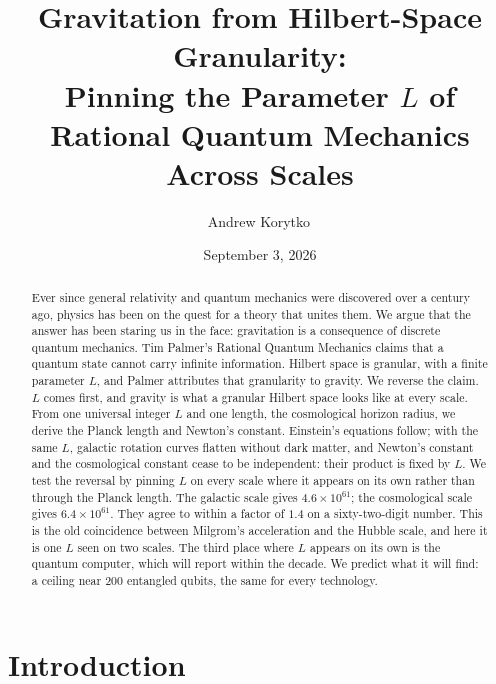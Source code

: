 \documentclass[aps,prd,twocolumn,superscriptaddress,nofootinbib,showkeys]{revtex4-2}
\begin{document}
\title{Gravitation from Hilbert-Space Granularity:\\ Pinning the Parameter $L$ of Rational Quantum Mechanics Across Scales}

\author{Andrew Korytko\,}

\date{September 3, 2026}

\begin{abstract}
Ever since general relativity and quantum mechanics were discovered over a century ago, physics has been on the quest for a theory that unites them. We argue that the answer has been staring us in the face: gravitation is a consequence of discrete quantum mechanics. Tim Palmer's Rational Quantum Mechanics claims that a quantum state cannot carry infinite information. Hilbert space is granular, with a finite parameter $L$, and Palmer attributes that granularity to gravity. We reverse the claim. $L$ comes first, and gravity is what a granular Hilbert space looks like at every scale. From one universal integer $L$ and one length, the cosmological horizon radius, we derive the Planck length and Newton's constant. Einstein's equations follow; with the same $L$, galactic rotation curves flatten without dark matter, and Newton's constant and the cosmological constant cease to be independent: their product is fixed by $L$. We test the reversal by pinning $L$ on every scale where it appears on its own rather than through the Planck length. The galactic scale gives $4.6\times10^{61}$; the cosmological scale gives $6.4\times10^{61}$. They agree to within a factor of $1.4$ on a sixty-two-digit number. This is the old coincidence between Milgrom's acceleration and the Hubble scale, and here it is one $L$ seen on two scales. The third place where $L$ appears on its own is the quantum computer, which will report within the decade. We predict what it will find: a ceiling near $200$ entangled qubits, the same for every technology.
\end{abstract}


\maketitle

\section{Introduction}
\end{document}
